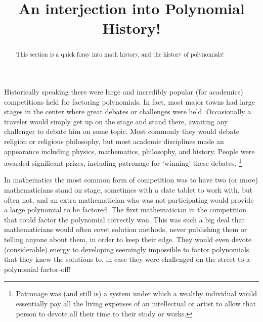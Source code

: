 \documentclass{ximeraXloud}
\title{An interjection into Polynomial History!}
\begin{document}
\begin{abstract}
    This section is a quick foray into math history, and the history of polynomials!
\end{abstract}
\maketitle

Historically speaking there were large and incredibly popular (for academics) competitions held for factoring polynomials. In fact, most major towns had large stages in the center where great debates or challenges were held. Occasionally a traveler would simply get up on the stage and stand there, awaiting any challenger to debate him on some topic. Most commonly they would debate religion or religious philosophy, but most academic disciplines made an appearance including physics, mathematics, philosophy, and history. People were awarded significant prizes, including patronage for `winning' these debates.%
\footnote{Patronage was (and still is) a system under which a wealthy individual would essentially pay all the living expenses of an intellectual or artist to allow that person to devote all their time to their study or works.}

In mathematics the most common form of competition was to have two (or more) mathematicians stand on stage, sometimes with a slate tablet to work with, but often not, and an extra mathematician who was not participating would provide a large polynomial to be factored. The first mathematician in the competition that could factor the polynomial correctly won. This was such a big deal that mathematicians would often covet solution methods, never publishing them or telling anyone about them, in order to keep their edge. They would even devote (considerable) energy to developing seemingly impossible to factor polynomials that they knew the solutions to, in case they were challenged on the street to a polynomial factor-off!
    
\end{document}
